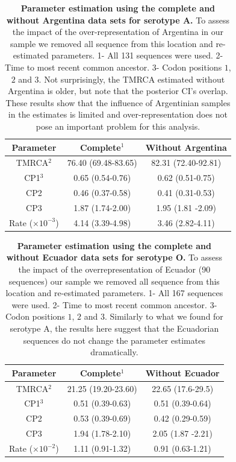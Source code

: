 \documentclass[a4paper,10pt]{article}
\begin{document}
\begin{table}[h]
\caption{ {{\bf Parameter estimation using the complete and without Argentina data sets for serotype A.}} To assess the impact of the over-representation of Argentina in our sample we removed all sequence from this location and re-estimated parameters.
1- All 131 sequences were used. 2- Time to most recent common ancestor. 3- Codon positions $1$, $2$ and $3$.
Not surprisingly, the TMRCA estimated without Argentina is older, but note that the posterior CI's overlap.
These results show that the influence of Argentinian samples in the estimates is limited and over-representation does not pose an important problem for this analysis.}
\begin{center}
\begin{tabular}{ccc}
\toprule
Parameter	&Complete$^{1}$	& Without Argentina\\
\midrule
TMRCA$^{2}$	&76.40 (69.48-83.65)	&82.31 (72.40-92.81)\\
CP1$	^{3}$	&0.65 (0.54-0.76)	&0.62 (0.51-0.75)\\
CP2	&0.46 (0.37-0.58)	&0.41 (0.31-0.53)\\
CP3	&1.87 (1.74-2.00)	& 1.95 (1.81 -2.09)\\
Rate ($\times 10^{-3}$)	&4.14 (3.39-4.98)	&3.46 (2.82-4.11)\\
\bottomrule
\end{tabular}
\end{center}
\label{stab:SB_A}
 \end{table}
\begin{table}[h]
\caption{ {{\bf Parameter estimation using the complete and without Ecuador data sets for serotype O.}} To assess the impact of the overrepresentation of Ecuador (90 sequences) our sample we removed all sequence from this location and re-estimated parameters.
1- All 167 sequences were used. 2- Time to most recent common ancestor. 3- Codon positions $1$, $2$ and $3$.
Similarly to what we found for serotype A, the results here suggest that the Ecuadorian sequences do not change the parameter estimates dramatically.}
\begin{center}
\begin{tabular}{ccc}
\toprule
Parameter	&Complete$^{1}$	&Without Ecuador\\
\midrule
TMRCA$^{2}$ & 21.25 (19.20-23.60) &22.65 (17.6-29.5)\\
CP1$^{3}$ & 0.51 (0.39-0.63) &0.51 (0.39-0.64)\\
CP2  &0.53 (0.39-0.69) & 0.42 (0.29-0.59)\\
CP3 &1.94 (1.78-2.10) & 2.05 (1.87 -2.21)\\
Rate ($\times 10^{-2}$)	&1.11 (0.91-1.32)&0.91 (0.63-1.21)\\
\bottomrule
\end{tabular}
\end{center}
\label{stab:SB_O}
 \end{table}
\end{document}

